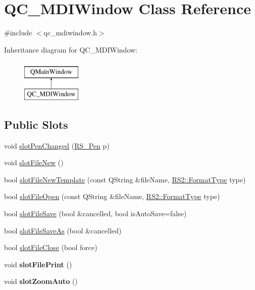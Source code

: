 \hypertarget{classQC__MDIWindow}{\section{Q\-C\-\_\-\-M\-D\-I\-Window Class Reference}
\label{classQC__MDIWindow}
}


{\ttfamily \#include $<$qc\-\_\-mdiwindow.\-h$>$}

Inheritance diagram for Q\-C\-\_\-\-M\-D\-I\-Window\-:\begin{figure}[H]
\begin{center}
\leavevmode
\includegraphics[height=2.000000cm]{classQC__MDIWindow}
\end{center}
\end{figure}
\subsection*{Public Slots}
\begin{DoxyCompactItemize}
\item 
void \hyperlink{classQC__MDIWindow_aa8e7c2b765b1f9bab8d42d580d5c6ef4}{slot\-Pen\-Changed} (\hyperlink{classRS__Pen}{R\-S\-\_\-\-Pen} p)
\item 
void \hyperlink{classQC__MDIWindow_a8ecccfc5421e809442d15ecc60445bb1}{slot\-File\-New} ()
\item 
bool \hyperlink{classQC__MDIWindow_a03e590dfb43c6d55198f97d2c0ceaad5}{slot\-File\-New\-Template} (const Q\-String \&file\-Name, \hyperlink{classRS2_a077a6c94c9a0ab9962c4d4a612c7189b}{R\-S2\-::\-Format\-Type} type)
\item 
bool \hyperlink{classQC__MDIWindow_aee3af356fecb710cea57c7d93a785c56}{slot\-File\-Open} (const Q\-String \&file\-Name, \hyperlink{classRS2_a077a6c94c9a0ab9962c4d4a612c7189b}{R\-S2\-::\-Format\-Type} type)
\item 
bool \hyperlink{classQC__MDIWindow_a0cfdc03ff8ab24e00c38ff2f6d11e4d8}{slot\-File\-Save} (bool \&cancelled, bool is\-Auto\-Save=false)
\item 
bool \hyperlink{classQC__MDIWindow_a3c765fcb82391e999aed1f17717574ca}{slot\-File\-Save\-As} (bool \&cancelled)
\item 
bool \hyperlink{classQC__MDIWindow_ac8baaf1598774f059867d306cd8c5a8d}{slot\-File\-Close} (bool force)
\item 
\hypertarget{classQC__MDIWindow_a4c198fb552595f7b6cdb18d11bfad40b}{void {\bfseries slot\-File\-Print} ()}\label{classQC__MDIWindow_a4c198fb552595f7b6cdb18d11bfad40b}

\item 
\hypertarget{classQC__MDIWindow_a78fbf254693f3ede83de29de0576fa11}{void {\bfseries slot\-Zoom\-Auto} ()}\label{classQC__MDIWindow_a78fbf254693f3ede83de29de0576fa11}

\end{DoxyCompactItemize}
